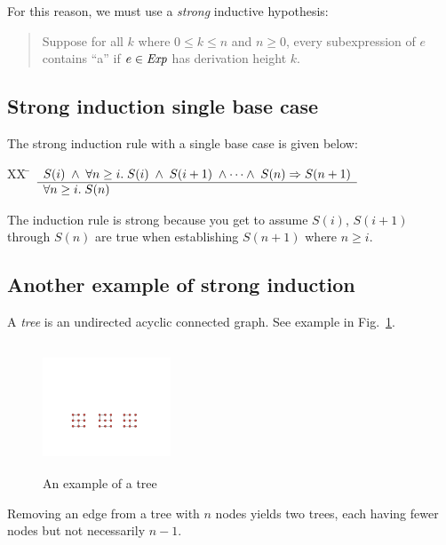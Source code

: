 \documentclass[12pt]{article}
\newcommand{\id}[1]{\mbox{\it #1\/}}
\begin{document}
For this reason, we must use a {\em strong\/} inductive hypothesis:

\begin{quote}
Suppose for all $k$ where $0\leq k\leq n$ and $n\geq 0$,
every subexpression of $e$ contains ``a'' if $e\in\id{Exp}$ has derivation height $k$.
\end{quote}

\subsection{Strong induction single base case}

The strong induction rule with a single base case is given below:
\begin{tabbing}
[2]XX \=  \kill
[2] \>
	\(\begin{array}[t]{l}
	S(i) \;\wedge\; \forall n \geq i.\;S(i)\;\wedge\;S(i+1)\;\wedge\cdots\wedge\;S(n) \Rightarrow S(n+1) \\
	\hline
	\forall n \geq i. \; S(n)
	\end{array}\)
\end{tabbing}
The induction rule is strong because you get to assume
$S(i)$, $S(i+1)$ through $S(n)$ are true when establishing $S(n+1)$ where $n\geq i$.

\subsection{Another example of strong induction}

\noindent A {\em tree\/} is an undirected acyclic connected graph.
See example in Fig.\ \ref{sp}.

\begin{figure}[h]
\centering
\includegraphics[width=1.5in, height=1.5in,keepaspectratio=true]{tree.pdf}
\caption{An example of a tree}
\label{sp}
\end{figure}

\vspace{0.5em}

\noindent Removing an edge from a tree with $n$ nodes yields two trees, each 
having fewer nodes but not necessarily $n-1$.
\end{document}

